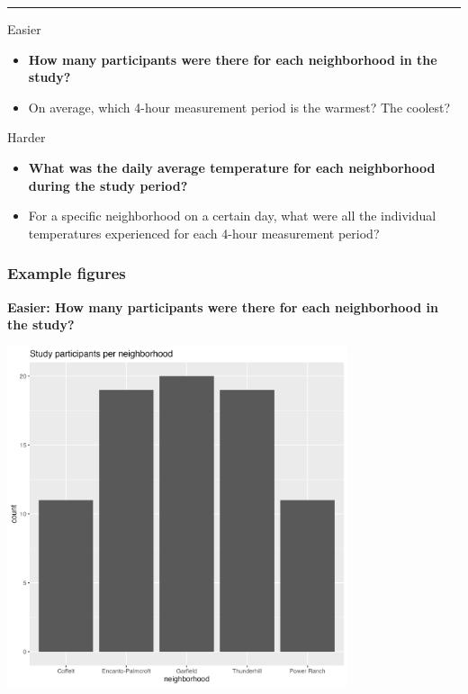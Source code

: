 \documentclass[
  letterpaper,
  DIV=11,
  numbers=noendperiod]{scrreprt}
\providecommand{\tightlist}{%
  \setlength{\itemsep}{0pt}\setlength{\parskip}{0pt}}\usepackage{longtable,booktabs,array}
\begin{document}
\begin{tcolorbox}
\begin{center}\rule{0.5\linewidth}{0.5pt}\end{center}

Easier

\begin{itemize}
\tightlist
\item
  \textbf{How many participants were there for each neighborhood in the
  study?}
\item
  On average, which 4-hour measurement period is the warmest? The
  coolest?
\end{itemize}

Harder

\begin{itemize}
\tightlist
\item
  \textbf{What was the daily average temperature for each neighborhood
  during the study period?}
\item
  For a specific neighborhood on a certain day, what were all the
  individual temperatures experienced for each 4-hour measurement
  period?
\end{itemize}

\hypertarget{example-figures-2}{%
\subsubsection{Example figures}\label{example-figures-2}}

\textbf{Easier: How many participants were there for each neighborhood
in the study?}

\includegraphics[width=0.75\textwidth,height=\textheight]{scripts/04_projects/project-day-2_files/figs/temps-easy.png}


\end{tcolorbox}
\end{document}
